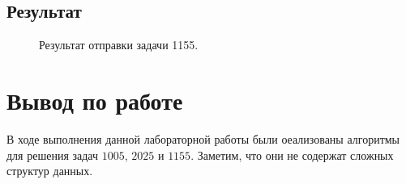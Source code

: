 \documentclass[a5paper, 10pt]{article}
\theoremstyle{definition}
\theoremstyle{plain}
\theoremstyle{remark}
\begin{document}
\subsection{Результат}
\begin{figure}[h]
\caption{Результат отправки задачи 1155.}
\end{figure}


\newpage
\section{Вывод по работе}
В ходе выполнения данной лабораторной работы были оеализованы алгоритмы для решения задач $1005$, $2025$ и $1155$. Заметим, что они не содержат сложных структур данных.
\end{document}

